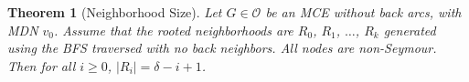 \documentclass[AMS, Times1COL]{article} %
\newtheorem{theorem}{Theorem}[section]
\theoremstyle{definition}
\begin{document}

	
	
	
	
	
	
	\begin{theorem}[Neighborhood Size]
		Let $G \in \mathcal{O}$ be an MCE without back arcs, with MDN $v_0$. Assume that the rooted neighborhoods are $R_0$, $R_1$, $\ldots$, $R_k$ generated using the BFS traversed with no back neighbors. All nodes are non-Seymour. Then for all $i \geq 0$, $|R_i| = \delta - i + 1$. 
		\label{layer_size}
	\end{theorem} 
	
\end{document}
